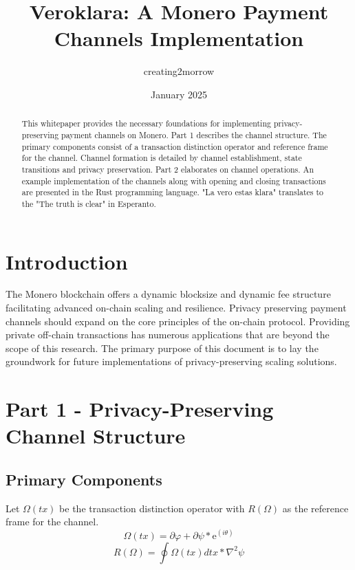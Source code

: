 \documentclass[11pt]{amsart}
\title{Veroklara: A Monero Payment Channels Implementation}
\author{creating2morrow}
\date{January 2025}
\begin{document}
\begin{abstract}
	This whitepaper provides the necessary foundations for implementing privacy-preserving payment channels on Monero. Part 1 describes the channel structure. The primary components consist of a transaction distinction operator and reference frame for the channel. Channel formation is detailed by channel establishment, state transitions and privacy preservation. Part 2 elaborates on channel operations. An example implementation of the channels along with opening and closing transactions are presented in the Rust programming language. "La vero estas klara" translates to the "The truth is clear" in Esperanto.
\end{abstract}
\maketitle

\tableofcontents

\section{Introduction}

The Monero blockchain offers a dynamic blocksize and dynamic fee structure facilitating advanced on-chain scaling and resilience. Privacy preserving payment channels should expand on the core principles of the on-chain protocol. Providing private off-chain transactions has numerous applications that are beyond the scope of this research. The primary purpose of this document is to lay the groundwork for future implementations of privacy-preserving scaling solutions. 

\section{Part 1 - Privacy-Preserving Channel Structure}

\subsection{Primary Components} 

Let \(\Omega(tx)\) be the transaction distinction operator with \(R(\Omega)\) as the reference frame for the channel.
\begin{equation*}
\Omega(tx) = \partial\varphi + \partial\psi * \mathrm{e}^{(i\theta)} 
\end{equation*}
\begin{equation*}
R(\Omega) = \oint\Omega(tx)dtx * \nabla^2\psi
\end{equation*}
\end{document}
